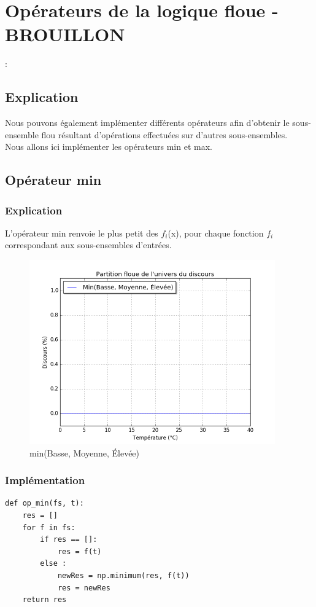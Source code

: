 \documentclass[a4paper]{article}
\begin{document}
\section{Opérateurs de la logique floue -BROUILLON}:

\subsection{Explication}
Nous pouvons également implémenter différents opérateurs afin d'obtenir le sous-ensemble flou résultant d'opérations effectuées sur d'autres sous-ensembles.\\
Nous allons ici implémenter les opérateurs min et max.

\subsection{Opérateur min}

\subsubsection{Explication}
L'opérateur min renvoie le plus petit des $f_i$(x), pour chaque fonction $f_i$ correspondant aux sous-ensembles d'entrées.

\begin{figure}[h]
\begin{center}
	\includegraphics[width=400px]{plot_test_min.png}
\end{center}
\caption{min(Basse, Moyenne, Élevée)}
\end{figure}

\subsubsection{Implémentation}
\begin{lstlisting}
def op_min(fs, t):
    res = []
    for f in fs:
        if res == []:
            res = f(t)
        else :
            newRes = np.minimum(res, f(t))
            res = newRes
    return res
\end{lstlisting}
\end{document}
